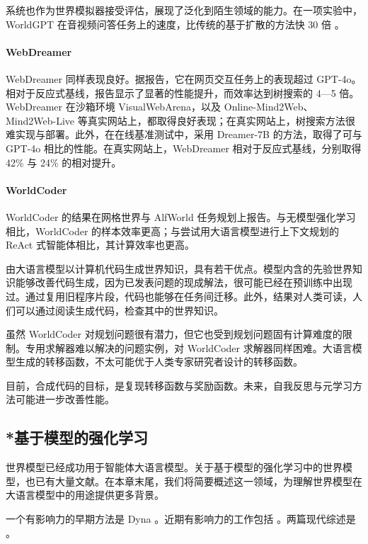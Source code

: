 系统也作为世界模拟器接受评估，展现了泛化到陌生领域的能力。在一项实验中，WorldGPT 在音视频问答任务上的速度，比传统的基于扩散的方法快 30 倍 \citep{ge2024worldgpt}。

\paragraph{WebDreamer} WebDreamer 同样表现良好。据报告，它在网页交互任务上的表现超过 GPT-4o。相对于反应式基线，报告显示了显著的性能提升，而效率达到树搜索的 4—5 倍。WebDreamer 在沙箱环境 VisualWebArena，以及 Online-Mind2Web、Mind2Web-Live 等真实网站上，都取得良好表现；在真实网站上，树搜索方法很难实现与部署。此外，在在线基准测试中，采用 Dreamer-7B 的方法，取得了可与 GPT-4o 相比的性能。在真实网站上，WebDreamer 相对于反应式基线，分别取得 42\% 与 24\% 的相对提升。

\paragraph{WorldCoder}
WorldCoder 的结果在网格世界与 AlfWorld 任务规划上报告。与无模型强化学习相比，WorldCoder 的样本效率更高；与尝试用大语言模型进行上下文规划的 ReAct 式智能体相比，其计算效率也更高。

由大语言模型以计算机代码生成世界知识，具有若干优点。模型内含的先验世界知识能够改善代码生成，因为已发表问题的现成解法，很可能已经在预训练中出现过。通过复用旧程序片段，代码也能够在任务间迁移。此外，结果对人类可读，人们可以通过阅读生成代码，检查其中的世界知识。

虽然 WorldCoder 对规划问题很有潜力，但它也受到规划问题固有计算难度的限制。专用求解器难以解决的问题实例，对 WorldCoder 求解器同样困难。大语言模型生成的转移函数，不太可能优于人类专家研究者设计的转移函数。

目前，合成代码的目标，是复现转移函数与奖励函数。未来，自我反思与元学习方法可能进一步改善性能。

\subsection{*基于模型的强化学习}\label{sec:mbrl}

世界模型已经成功用于智能体大语言模型。关于基于模型的强化学习中的世界模型，也已有大量文献。在本章末尾，我们将简要概述这一领域，为理解世界模型在大语言模型中的用途提供更多背景。

一个有影响力的早期方法是 Dyna \citep{sutton1991dyna}。近期有影响力的工作包括 \citep{ha2018world,hafner2020mastering}。两篇现代综述是 \citet{moerland2023model,plaat2023high}。

